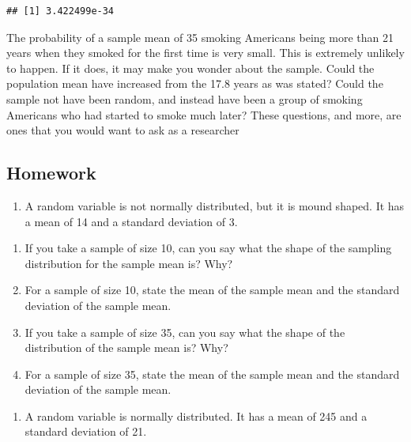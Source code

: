 \documentclass[
]{book}
\providecommand{\tightlist}{%
  \setlength{\itemsep}{0pt}\setlength{\parskip}{0pt}}
\begin{document}
\begin{verbatim}
## [1] 3.422499e-34
\end{verbatim}

The probability of a sample mean of 35 smoking Americans being more than 21 years when they smoked for the first time is very small. This is extremely unlikely to happen. If it does, it may make you wonder about the sample. Could the population mean have increased from the 17.8 years as was stated? Could the sample not have been random, and instead have been a group of smoking Americans who had started to smoke much later? These questions, and more, are ones that you would want to ask as a researcher

\hypertarget{homework-15}{%
\subsection{Homework}\label{homework-15}}

\begin{enumerate}
\def\labelenumi{\arabic{enumi}.}
\tightlist
\item
  A random variable is not normally distributed, but it is mound shaped. It has a mean of 14 and a standard deviation of 3.
\end{enumerate}

\begin{enumerate}
\def\labelenumi{\alph{enumi}.}
\tightlist
\item
  If you take a sample of size 10, can you say what the shape of the sampling distribution for the sample mean is? Why?
\item
  For a sample of size 10, state the mean of the sample mean and the standard deviation of the sample mean.
\item
  If you take a sample of size 35, can you say what the shape of the distribution of the sample mean is? Why?
\item
  For a sample of size 35, state the mean of the sample mean and the standard deviation of the sample mean.
\end{enumerate}

\begin{enumerate}
\def\labelenumi{\arabic{enumi}.}
\setcounter{enumi}{1}
\tightlist
\item
  A random variable is normally distributed. It has a mean of 245 and a standard deviation of 21.
\end{enumerate}
\end{document}

